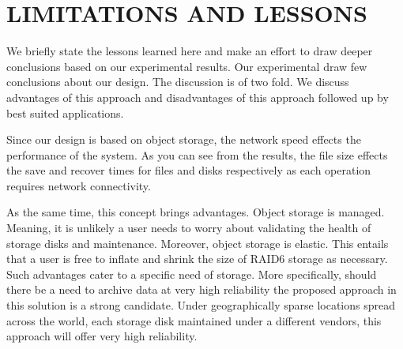 \section{LIMITATIONS AND LESSONS}
\label{sec:lessons}

We briefly state the lessons learned here and make an effort to draw deeper conclusions based on our experimental results.
Our experimental draw few conclusions about our design.
The discussion is of two fold.
We discuss advantages of this approach and disadvantages of this approach followed up by best suited applications.

Since our design is based on object storage, the network speed effects the performance of the system.
As you can see from the results, the file size effects the save and recover times for files and disks respectively as each operation requires network connectivity.

As the same time, this concept brings advantages.
Object storage is managed.
Meaning, it is unlikely a user needs to worry about validating the health of storage disks and maintenance. 
Moreover, object storage is elastic.
This entails that a user is free to inflate and shrink the size of RAID6 storage as necessary.
Such advantages cater to a specific need of storage.
More specifically, should there be a need to archive data at very high reliability the proposed approach in this solution is a strong candidate.
Under geographically sparse locations spread across the world, each storage disk maintained under a different vendors, this approach will offer very high reliability.
